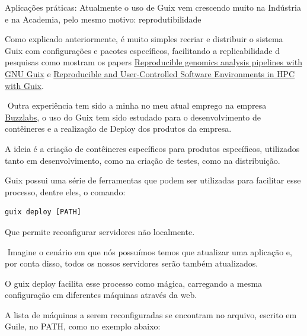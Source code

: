 \documentclass[bigger]{beamer}
\begin{document}
\begin{frame}[label={sec:orgf956306}]{Aplicações práticas:}
Atualmente o uso de Guix vem crescendo muito na Indústria e na Academia, pelo mesmo motivo: reprodutibilidade

Como explicado anteriormente, é muito simples recriar e distribuir o sistema Guix com configurações e pacotes
específicos, facilitando a replicabilidade d pesquisas como mostram os papers
\href{https://www.biorxiv.org/content/10.1101/298653v2}{Reproducible genomics analysis pipelines with GNU Guix} e
\href{https://inria.hal.science/hal-01161771/en}{Reproducible and User-Controlled Software Environments in HPC with Guix}.
\end{frame}
\begin{frame}[label={sec:org2fc2282},fragile]{⁤}
 Outra experiência tem sido a minha no meu atual emprego na empresa \href{https://www.buzzlabs.com.br/}{Buzzlabs}, o uso do Guix tem sido estudado
para o desenvolvimento de contêineres e a realização de Deploy dos produtos da empresa.

A ideia é a criação de contêineres específicos para produtos específicos, utilizados tanto em desenvolvimento,
como na criação de testes, como na distribuição.

Guix possui uma série de ferramentas que podem ser utilizadas para facilitar esse processo, dentre eles, o
comando:
\begin{verbatim}
guix deploy [PATH]
\end{verbatim}
Que permite reconfigurar servidores não localmente.
\end{frame}
\begin{frame}[label={sec:org2fe1df0}]{⁤}
Imagine o cenário em que nós possuímos temos que atualizar uma aplicação e, por conta disso, todos os nossos
servidores serão também atualizados.

O guix deploy facilita esse processo como mágica, carregando a mesma configuração em diferentes máquinas
através da web.

A lista de máquinas a serem reconfiguradas se encontram no arquivo, escrito em Guile, no PATH, como no exemplo
abaixo:
\end{frame}
\end{document}
